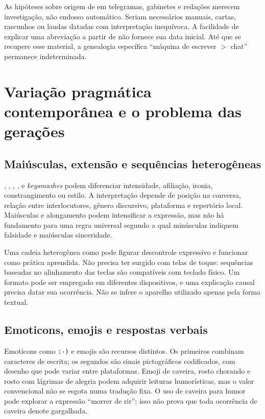 As hipóteses sobre origem de  em telegramas, gabinetes e redações merecem investigação, não endosso automático. Seriam necessários manuais, cartas, rascunhos ou laudas datadas com interpretação inequívoca. A facilidade de explicar uma abreviação a partir de  não fornece sua data inicial. Até que se recupere esse material, a genealogia específica ``máquina de escrever $>$ chat'' permanece indeterminada.

\section{Variação pragmática contemporânea e o problema das gerações}
\subsection{Maiúsculas, extensão e sequências heterogêneas}
, , , ,  e \emph{keysmashes} podem diferenciar intensidade, afiliação, ironia, constrangimento ou estilo. A interpretação depende de posição na conversa, relação entre interlocutores, gênero discursivo, plataforma e repertório local. Maiúsculas e alongamento podem intensificar a expressão, mas não há fundamento para uma regra universal segundo a qual minúsculas indiquem falsidade e maiúsculas sinceridade.

Uma cadeia heterogênea como  pode figurar descontrole expressivo e funcionar como prática aprendida. Não precisa ter surgido com telas de toque: sequências baseadas no alinhamento das teclas são compatíveis com teclado físico. Um formato pode ser empregado em diferentes dispositivos, e uma explicação causal precisa datar sua ocorrência. Não se infere o aparelho utilizado apenas pela forma textual.

\subsection{Emoticons, emojis e respostas verbais}
Emoticons como \texttt{:-)} e emojis são recursos distintos. Os primeiros combinam caracteres de escrita; os segundos são sinais pictográficos codificados, com desenho que pode variar entre plataformas. Emoji de caveira, rosto chorando e rosto com lágrimas de alegria podem adquirir leituras humorísticas, mas o valor convencional não se esgota numa tradução fixa. O uso de caveira para humor pode explorar a expressão ``morrer de rir''; isso não prova que toda ocorrência de caveira denote gargalhada.

